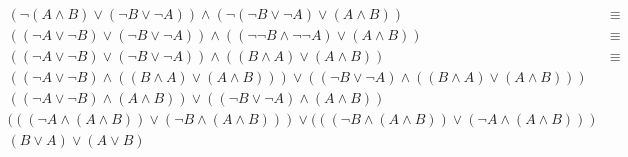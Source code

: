 \begin{enumerate}
\begin{enumerate}
\[\begin{array}{lcl}
							(\neg (A \land B) \lor (\neg B \lor \neg A)) \land (\neg (\neg B \lor \neg A) \lor (A \land B)) &\equiv & \\
							((\neg A \lor \neg B) \lor (\neg B \lor \neg A)) \land ((\neg \neg B \land \neg \neg A) \lor (A \land B)) & \equiv& \\
							((\neg A \lor \neg B) \lor (\neg B \lor \neg A)) \land ((B \land A) \lor (A \land B)) & \equiv& \\
							((\neg A \lor \neg B) \land ((B \land A) \lor (A \land B))) \lor ((\neg B \lor \neg A) \land ((B \land A) \lor (A \land B))) & & \\
							((\neg A \lor \neg B) \land (A \land B)) \lor ((\neg B \lor \neg A) \land (A \land B)) & & \\
							(((\neg A \land (A \land B)) \lor (\neg B \land (A \land B))) \lor (((\neg B \land (A \land B)) \lor (\neg A \land (A \land B))) & & \\
							(B \lor A) \lor (A \lor B) & & \\
						
							
						\end{array}
					\]
			\end{enumerate}
		
	\end{enumerate}






